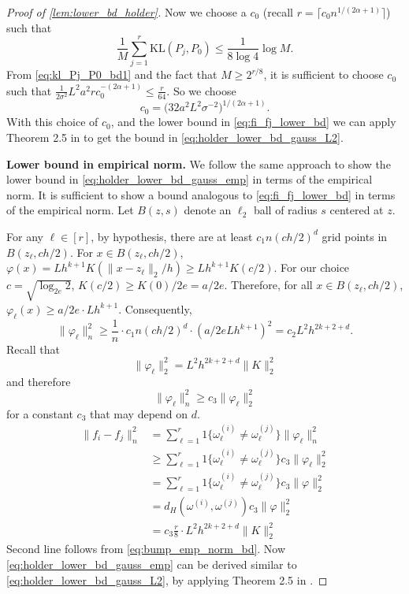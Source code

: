\documentclass[ejs,noshowframe]{imsart}
\theoremstyle{plain}
\theoremstyle{definition}
\newcommand{\kl}{\mathrm{KL}}
\begin{document}
\begin{appendix}
\begin{proof}[Proof of \autoref{lem:lower_bd_holder}]
Now we choose a $c_0$ (recall  $r = \lceil c_0 n^{1/(2\alpha+1)}\rceil$) such 
that
\begin{equation}
\frac 1M \sum_{j=1}^r \kl(P_j, P_0) \leq \frac{1}{8 \log 4} \log M.
\end{equation}
From \eqref{eq:kl_Pj_P0_bd1} and the fact that $M\ge 2^{r/8}$, it is sufficient 
to choose $c_0$ such that
$\frac{1}{2\sigma^2} L^2 a^2 r c_0^{-(2\alpha+1)} \leq \frac{r}{64}.$ So we 
choose
\begin{equation}
c_0 = \big( 32 a^2 L^2 \sigma^{-2} \big)^{1/(2\alpha+1)}.
\end{equation}
With this choice of $c_0$, and the lower bound in \eqref{eq:fi_fj_lower_bd} we 
can apply Theorem 
2.5 in \cite{tsybakov2009introduction} to get the bound in 
\eqref{eq:holder_lower_bd_gauss_L2}.

\textbf{Lower bound in empirical norm.}
We follow the same approach to show the lower bound in 
\eqref{eq:holder_lower_bd_gauss_emp} in 
terms of the empirical norm.
It is sufficient to show a bound analogous to \eqref{eq:fi_fj_lower_bd} in 
terms of the empirical 
norm.
Let $B(z, s)$ denote an $\ell_2$ ball of radius $s$ centered at $z.$ 

For any $\ell \in [r]$, by hypothesis, there are at least $c_1 n (ch/2)^d$ grid 
points in $B(z_\ell, 
ch/2)$. For $x\in B(z_\ell, ch/2)$, $\varphi(x) = L h^{k+1} K(\|x-z_\ell\|_2/h) 
\ge L h^{k+1} K(c/2).$
For our choice $c = \sqrt{\log_{2e}{2}}$, $K(c/2) \ge K(0)/2e = a/2e.$ 
Therefore, for all $x 
\in B(z_\ell, ch/2)$, $\varphi_\ell(x) \ge a/2e \cdot L h^{k+1}$. Consequently,
\begin{equation}
	\| \varphi_\ell\|_n^2 \ge \frac{1}{n} \cdot c_1 n (ch/2)^d \cdot (a/2e 
L h^{k+1})^2 = c_2 L^2 
	h^{2k+2+d}.
\end{equation}
Recall that 
\[
\| \varphi_\ell \|_2^2 = L^2 h^{2k+2+d} \| K \|_2^2
\]
and therefore
\begin{equation}
	\label{eq:bump_emp_norm_bd}
		\| \varphi_\ell\|_n^2 \geq c_3 	\| \varphi_\ell\|_2^2
\end{equation}
for a constant $c_3$ that may depend on $d$.
\begin{align}
\| f_i - f_j \|_n^2 
&= \sum_{\ell = 1}^r 1 \big\{ \omega_\ell^{(i)} \neq \omega_\ell^{(j)}  \big\} 
\| \varphi_\ell\|_n^2\\
&\ge \sum_{\ell = 1}^r 1 \big\{ \omega_\ell^{(i)} \neq \omega_\ell^{(j)}  
\big\} c_3 \| \varphi_\ell\|_2^2\\
&= \sum_{\ell = 1}^r 1 \big\{ \omega_\ell^{(i)} \neq \omega_\ell^{(j)}  \big\} 
c_3 \| \varphi\|_2^2\\
&= d_H( \omega^{(i)}, \omega^{(j)})  c_3 \| \varphi\|_2^2\\
&= c_3  \frac{r}{8} \cdot L^2 h^{2k+2+d} \| K \|_2^2
\end{align}
Second line follows from \eqref{eq:bump_emp_norm_bd}.
Now \eqref{eq:holder_lower_bd_gauss_emp} can be derived similar to
\eqref{eq:holder_lower_bd_gauss_L2}, by applying Theorem 2.5 in 
\cite{tsybakov2009introduction}.
\end{proof}


\end{appendix}
\end{document}
